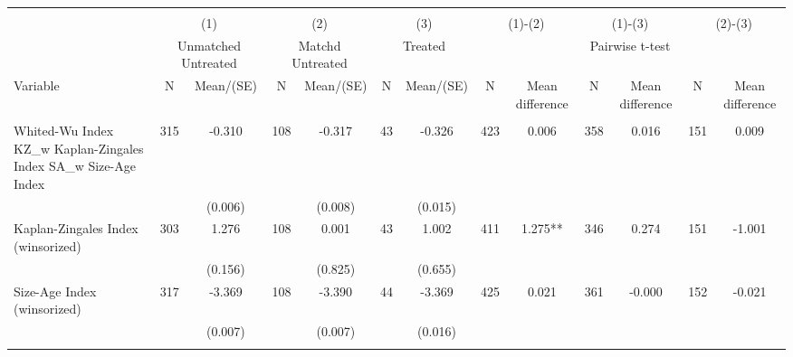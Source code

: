 
\begin{tabular}{@{\extracolsep{5pt}}lcccccccccccc}
\\[-1.8ex]\hline \hline \\[-1.8ex]
 & \multicolumn{2}{c}{(1)}  & \multicolumn{2}{c}{(2)}  & \multicolumn{2}{c}{(3)}  & \multicolumn{2}{c}{(1)-(2)} & \multicolumn{2}{c}{(1)-(3)} & \multicolumn{2}{c}{(2)-(3)} \\
 & \multicolumn{2}{c}{Unmatched Untreated}  & \multicolumn{2}{c}{Matchd Untreated}  & \multicolumn{2}{c}{Treated}  & \multicolumn{6}{c}{Pairwise t-test}  \\
Variable & N & Mean/(SE) & N & Mean/(SE) & N & Mean/(SE) & N & Mean difference & N & Mean difference & N & Mean difference \\ \hline \\[-1.8ex] 
Whited-Wu Index KZ\_w Kaplan-Zingales Index SA\_w Size-Age Index   & 315    & -0.310    & 108    & -0.317    & 43    & -0.326    & 423    & 0.006    & 358    & 0.016    & 151    & 0.009   \\
 &   & (0.006)  &   & (0.008)  &   & (0.015)  &   &  &   &  &   &  \\ [1ex]
Kaplan-Zingales Index (winsorized)   & 303    & 1.276    & 108    & 0.001    & 43    & 1.002    & 411    & 1.275**    & 346    & 0.274    & 151    & -1.001   \\
 &   & (0.156)  &   & (0.825)  &   & (0.655)  &   &  &   &  &   &  \\ [1ex]
Size-Age Index (winsorized)   & 317    & -3.369    & 108    & -3.390    & 44    & -3.369    & 425    & 0.021    & 361    & -0.000    & 152    & -0.021   \\
 &   & (0.007)  &   & (0.007)  &   & (0.016)  &   &  &   &  &   &  \\ [1ex]
\hline \hline \\[-1.8ex]

\end{tabular}
